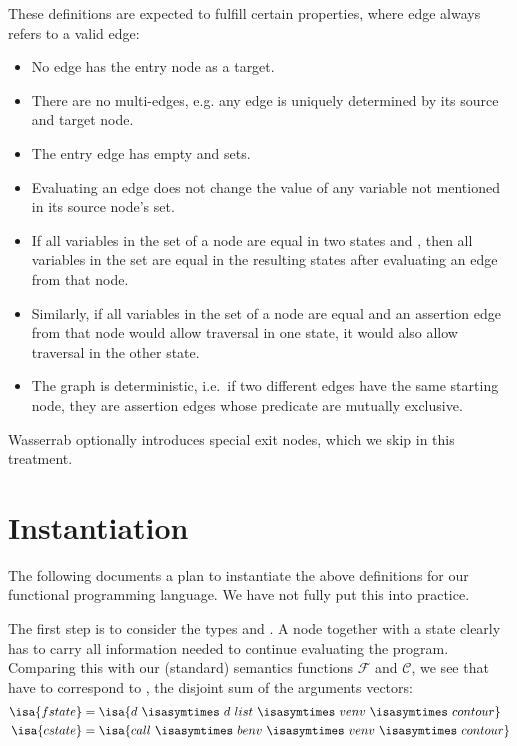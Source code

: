 \documentclass[a4paper,parskip=half,BCOR=8mm,DIV=calc,12pt]{scrbook}
\newcommand{\C}{\mathcal C}
\newcommand{\F}{\mathcal F}
\begin{document}
\pagebreak[2]
These definitions are expected to fulfill certain properties, where edge always refers to a valid edge:
\begin{itemize}
\item No edge has the entry node as a target. 
\item There are no multi-edges, e.g. any edge is uniquely determined by its source and target node.
\item The entry edge has empty  and  sets.
\item Evaluating an edge does not change the value of any variable not mentioned in its source node’s  set.
\item If all variables in the  set of a node are equal in two states  and , then all variables in the  set are equal in the resulting states after evaluating an edge from that node.
\item Similarly, if all variables in the  set of a node are equal and an assertion edge from that node would allow traversal in one state, it would also allow traversal in the other state.
\item The graph is deterministic, i.e.\ if two different edges have the same starting node, they are assertion edges whose predicate are mutually exclusive.
\end{itemize}
Wasserrab optionally introduces special exit nodes, which we skip in this treatment.

\section{Instantiation}

The following documents a plan to instantiate the above definitions for our functional programming language. We have not fully put this into practice.

The first step is to consider the types  and . A node together with a state clearly has to carry all information needed to continue evaluating the program. Comparing this with our (standard) semantics functions $\F$ and $\C$, we see that  have to correspond to , the disjoint sum of the arguments vectors:
\begin{align*}
\isa{fstate} &= \isa{d\ \isasymtimes\ d\ list\ \isasymtimes\ venv\ \isasymtimes\ contour}\\
\isa{cstate} &= \isa{call\ \isasymtimes\ benv\ \isasymtimes\ venv\ \isasymtimes\ contour}
\end{align*}
\end{document}
